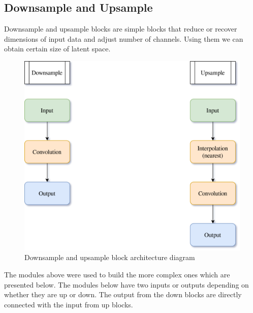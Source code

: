 \documentclass[11pt,a4paper]{report}
\begin{document}
\subsection{Downsample and Upsample}
Downsample and upsample blocks are simple blocks that reduce or recover dimensions of input data and adjust number of channels. Using them we can obtain certain size of latent space.
\begin{figure}[H]
	\centering
	\includegraphics[scale=0.2]{images/UpDownSample.drawio}
    \caption{Downsample and upsample block architecture diagram}
\end{figure}

The modules above were used to build the more complex ones which are presented below. The modules below have two inputs or outputs depending on whether they are up or down. The output from the down blocks are directly connected with the input from up blocks.
\end{document}

